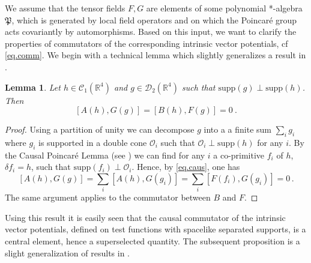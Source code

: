 \documentclass[11pt]{article}
\newtheorem{lemma}[theorem]{Lemma}
\numberwithin{equation}{section}
\newcommand{\RR}{{\mathbb R}}
\newcommand{\Cc}{{\mathcal{C}}}
\newcommand{\Dc}{{\mathcal{D}}}
\newcommand{\Oc}{{\mathcal{O}}}
\newcommand{\fP}{{\mathfrak P}}
\newcommand{\supp}{{\mathrm{supp}}}
\begin{document}
\medskip
We assume that the tensor fields $F, G$ are elements of some 
polynomial *-algebra $\fP$, which is generated by local field operators
and on which the Poincar\'e group acts covariantly by automorphisms. 
Based on this input, we want to clarify the properties of commutators of 
the corresponding intrinsic vector potentials, cf \eqref{eq.comm}. 
We begin with a technical lemma which slightly generalizes a result 
in \cite{BuCiRuVa1}. 
\begin{lemma}
\label{lem.2.1}
Let $h \in \Cc_1(\RR^4)$ and $g \in \Dc_2(\RR^4)$ such that  
$\supp(g) \perp \supp(h)$. Then
$$
[ A(h) , G(g) ]  =  [B(h),F(g)]=0 \   .
$$
\end{lemma}

\begin{proof}
Using a partition of unity we can decompose $g$ into a a finite sum 
$\sum_i g_i$ where $g_i$ is supported in a double cone $\Oc_i$ such 
that $\Oc_i \perp \supp (h)$ for any $i$.
By the Causal Poincar\'e Lemma (see \cite[Appendix]{BuCiRuVa1}) 
we can find for any $i$ a co-primitive $f_i$ of $h$,
$\delta f_i = h$, such that 
$\supp(f_i) \perp \Oc_i$. Hence, by \eqref{eq.caus}, one has  
$$
[ A(h) , G(g)] = \sum_i [A(h) , G(g_i)] = \sum_i [F(f_i) , G(g_i)]=0 \, .
$$ 
The same argument applies to the commutator between $B$ and $F$. 
\end{proof}

Using this result it is easily seen that the causal commutator of the 
intrinsic vector potentials, defined on test functions with
spacelike separated supports,   
is a central element, hence a superselected quantity.
The subsequent proposition is a slight generalization of 
results in \cite[Appendix]{BuCiRuVa1}.
\end{document}

